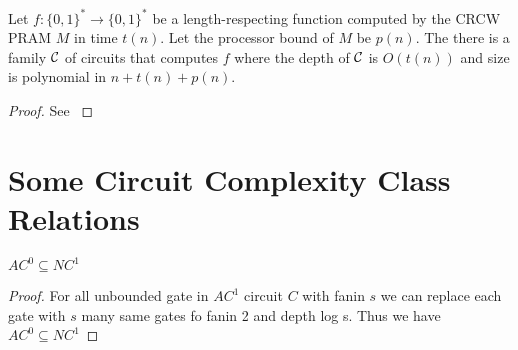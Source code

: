 \begin{theorem}\label{volthm2.56}
Let $f:\{0,1\}^*\to \{0,1\}^*$ be a length-respecting function computed by the CRCW PRAM $M$ in time $t(n)$. Let the processor bound of $M$ be $p(n)$. The there is a family $\mathcal{C}$ of circuits that computes $f$ where the depth of $\mathcal{C}$ is $O(t(n))$ and size is polynomial in $n+t(n)+p(n)$.
\end{theorem}
\begin{proof}
See \cite[Theorem 2.56, Page  70]{VollmerCh2}
\end{proof}

\section{Some Circuit Complexity Class Relations}
\begin{theorem}
	$AC^0\subseteq NC^1$
\end{theorem}
\begin{proof}
	For all unbounded gate in $AC^1$ circuit $C$ with fanin $s$ we can replace each gate with $s$ many same gates fo fanin 2 and depth log s. Thus we have $AC^0\subseteq NC^1$
\end{proof}


